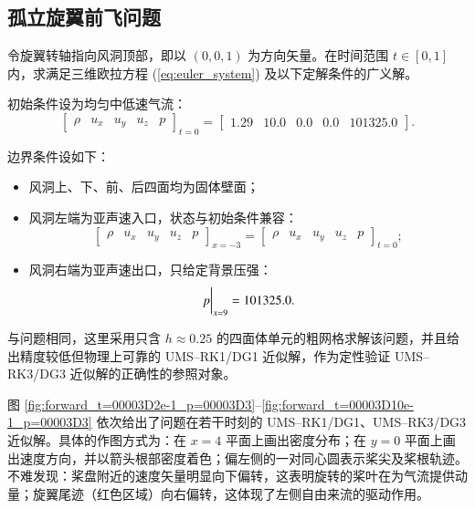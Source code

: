 \newpage{}

\subsection{孤立旋翼前飞问题}
\begin{problem}
[孤立旋翼前飞]\label{prob:=005B64=007ACB=0065CB=007FFC=00524D=0098DE}令旋翼转轴指向风洞顶部，即以
$(0,0,1)$ 为方向矢量。在时间范围 $t\in[0,1]$ 内，求满足三维欧拉方程 (\ref{eq:euler_system})
及以下定解条件的广义解。

初始条件设为均匀中低速气流：
\begin{equation}
\begin{bmatrix}\rho & u_{x} & u_{y} & u_{z} & p\end{bmatrix}_{t=0}=\begin{bmatrix}1.29 & 10.0 & 0.0 & 0.0 & 101325.0\end{bmatrix}.
\end{equation}

边界条件设如下：
\begin{itemize}
\item 风洞上、下、前、后四面均为固体壁面；
\item 风洞左端为亚声速入口，状态与初始条件兼容：
\begin{equation}
\begin{bmatrix}\rho & u_{x} & u_{y} & u_{z} & p\end{bmatrix}_{x=-3}=\begin{bmatrix}\rho & u_{x} & u_{y} & u_{z} & p\end{bmatrix}_{t=0};
\end{equation}
\item 风洞右端为亚声速出口，只给定背景压强：
\begin{equation}
\eval{p}_{x=9}=101325.0.
\end{equation}
\end{itemize}
\end{problem}

与问题相同，这里采用只含
$h\approx0.25$ 的四面体单元的粗网格求解该问题，并且给出精度较低但物理上可靠的 UMS–RK1/DG1 近似解，作为定性验证
UMS–RK3/DG3 近似解的正确性的参照对象。

图 \ref{fig:forward_t=00003D2e-1_p=00003D3}–\ref{fig:forward_t=00003D10e-1_p=00003D3}
依次给出了问题在若干时刻的
UMS–RK1/DG1、UMS–RK3/DG3 近似解。具体的作图方式为：在 $x=4$ 平面上画出密度分布；在 $y=0$ 平面上画出速度方向，并以箭头根部密度着色；偏左侧的一对同心圆表示桨尖及桨根轨迹。不难发现：桨盘附近的速度矢量明显向下偏转，这表明旋转的桨叶在为气流提供动量；旋翼尾迹（红色区域）向右偏转，这体现了左侧自由来流的驱动作用。

